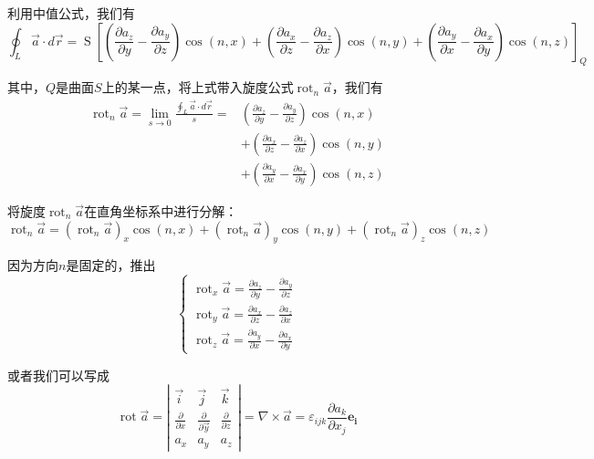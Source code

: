 \documentclass{ctexart}
\begin{document}
    \par
    利用中值公式，我们有
    $$
     \oint_{L} \vec{a} \cdot d \vec{r}=\operatorname{S}[(\frac{\partial a_{z}}{\partial y}-\frac{\partial a_{y}}{\partial z}) \cos (n, x) 
     +(\frac{\partial a_{x}}{\partial z}-\frac{\partial a_{z}}{\partial x}) \cos (n, y)+(\frac{\partial a_{y}}{\partial x}-\frac{\partial a_{x}}{\partial y}) \cos (n, z)]_{Q}
    $$
    \par
    其中，$Q$是曲面$S$上的某一点，将上式带入旋度公式$\operatorname{rot} _{n} \vec{a}$，我们有
    $$
    \begin{aligned}
    \operatorname{rot} _{n} \vec{a}=\lim _{s \rightarrow 0} \frac{\oint_{L} \vec{a} \cdot d \vec{r}}{s}=&\left(\frac{\partial a_{z}}{\partial y}-\frac{\partial a_{y}}{\partial z}\right) \cos (n, x) \\
    &+\left(\frac{\partial a_{x}}{\partial z}-\frac{\partial a_{z}}{\partial x}\right) \cos (n, y) \\
    &+\left(\frac{\partial a_{y}}{\partial x}-\frac{\partial a_{x}}{\partial y}\right) \cos (n, z)
    \end{aligned}
    $$
    \par
    将旋度$\operatorname{rot} _{n} \vec{a}$在直角坐标系中进行分解：
    $$
     \operatorname{rot} _{n} \vec{a} =  (\operatorname{rot} _{n} \vec{a})_{x} \cos(n,x) +(\operatorname{rot} _{n} \vec{a})_{y} \cos(n,y) +(\operatorname{rot} _{n} \vec{a})_{z} \cos(n,z)
    $$
    \par
    因为方向$n$是固定的，推出
    $$
    \left\{\begin{array}{l}
    \operatorname{rot}_{x} \vec{a}=\frac{\partial a_{z}}{\partial y}-\frac{\partial a_{y}}{\partial z} \\
    \operatorname{rot}_{y} \vec{a}=\frac{\partial a_{x}}{\partial z}-\frac{\partial a_{z}}{\partial x} \\
    \operatorname{rot}_{z} \vec{a}=\frac{\partial a_{y}}{\partial x}-\frac{\partial a_{x}}{\partial y}
    \end{array}\right.
    $$
    \par
    或者我们可以写成
    $$
    \operatorname{rot} \vec{a}=\left|\begin{array}{ccc}
    \vec{i} & \vec{j} & \vec{k} \\
   \frac{\partial}{\partial x} & \frac{\partial}{\partial \vec{y}} & \frac{\partial}{\partial z} \\
   a_{x} & a_{y} & a_{z}
   \end{array}\right|=\nabla \times \vec{a}= \varepsilon_{i j k} \frac{\partial a_{k}}{\partial x_{j}} \boldsymbol{e_{i}}
    $$
    
\end{document}
